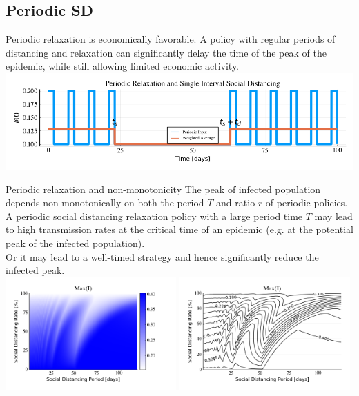 \documentclass[10pt]{beamer}
\begin{document}
\subsection{Periodic SD}
\begin{frame}{Periodic relaxation is economically favorable.}
	 A policy with regular periods of distancing and relaxation can significantly delay the time of the peak of the epidemic, while still allowing limited economic activity. \\ \vspace{1cm}
	\includegraphics[width=1\textwidth]{epidemic-combination.png}
\end{frame}

\begin{frame}{Periodic relaxation and non-monotonicity}
	The peak of infected population depends non-monotonically on both the period $T$ and ratio $r$ of periodic policies. \\ \vspace{0.5cm}
	A periodic social distancing relaxation policy with a large period time $T$ may lead to high transmission rates at the critical time of an epidemic (e.g. at the potential peak of the infected population).  \\ \vspace{0.5cm}
	Or it may lead to a well-timed strategy and hence significantly reduce the infected peak. \\ \vspace{0.5cm}
	\includegraphics[width=0.49\textwidth]{epidemic-periodic-heatmap.png}
	\includegraphics[width=0.49\textwidth]{epidemic-periodic-contour.png} 
\end{frame}
\end{document}
